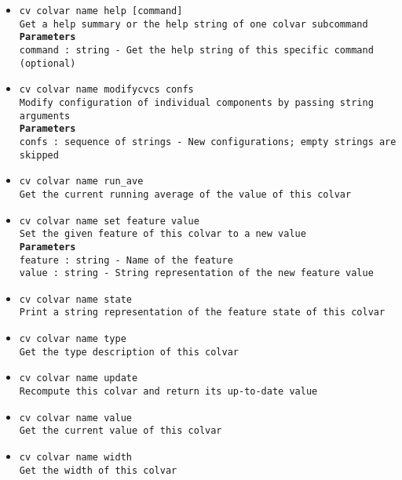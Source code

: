 \begin{itemize}
\item \texttt{cv colvar name help [command]}
\\
\texttt{Get a help summary or the help string of one colvar subcommand}
\\
\texttt{\textbf{Parameters}}
\\
\texttt{command : string - Get the help string of this specific command (optional)}
\item \texttt{cv colvar name modifycvcs confs}
\\
\texttt{Modify configuration of individual components by passing string arguments}
\\
\texttt{\textbf{Parameters}}
\\
\texttt{confs : sequence of strings - New configurations; empty strings are skipped}
\item \texttt{cv colvar name run\_ave}
\\
\texttt{Get the current running average of the value of this colvar}
\item \texttt{cv colvar name set feature value}
\\
\texttt{Set the given feature of this colvar to a new value}
\\
\texttt{\textbf{Parameters}}
\\
\texttt{feature : string - Name of the feature}
\\
\texttt{value : string - String representation of the new feature value}
\item \texttt{cv colvar name state}
\\
\texttt{Print a string representation of the feature state of this colvar}
\item \texttt{cv colvar name type}
\\
\texttt{Get the type description of this colvar}
\item \texttt{cv colvar name update}
\\
\texttt{Recompute this colvar and return its up-to-date value}
\item \texttt{cv colvar name value}
\\
\texttt{Get the current value of this colvar}
\item \texttt{cv colvar name width}
\\
\texttt{Get the width of this colvar}
\end{itemize}
